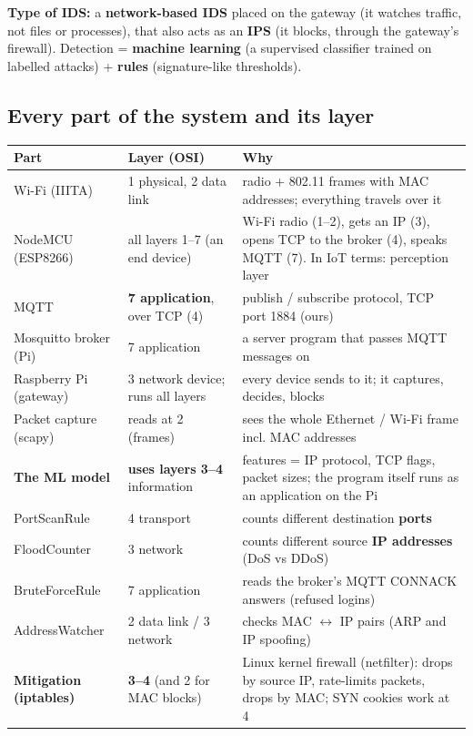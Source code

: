 \documentclass[11pt,a4paper]{article}
\begin{document}
\textbf{Type of IDS:} a \textbf{network-based IDS} placed on the gateway (it watches traffic, not files or processes),
that also acts as an \textbf{IPS} (it blocks, through the gateway's firewall). Detection = \textbf{machine learning}
(a supervised classifier trained on labelled attacks) + \textbf{rules} (signature-like thresholds).

\subsection{Every part of the system and its layer}

\begin{longtable}{P{3.5cm}P{3.6cm}P{7.9cm}}
\toprule
Part & Layer (OSI) & Why \\
\midrule
\endhead
Wi-Fi (IIITA) & 1 physical, 2 data link & radio + 802.11 frames with MAC addresses; everything travels over it \\
NodeMCU (ESP8266) & all layers 1--7 (an end device) & Wi-Fi radio (1--2), gets an IP (3), opens TCP to the broker (4),
speaks MQTT (7). In IoT terms: perception layer \\
MQTT & \textbf{7 application}, over TCP (4) & publish / subscribe protocol, TCP port 1884 (ours) \\
Mosquitto broker (Pi) & 7 application & a server program that passes MQTT messages on \\
Raspberry Pi (gateway) & 3 network device; runs all layers & every device sends to it; it captures, decides,
blocks \\
Packet capture (scapy) & reads at 2 (frames) & sees the whole Ethernet / Wi-Fi frame incl. MAC addresses \\
\textbf{The ML model} & \textbf{uses layers 3--4} information & features = IP protocol, TCP flags, packet sizes;
the program itself runs as an application on the Pi \\
PortScanRule & 4 transport & counts different destination \textbf{ports} \\
FloodCounter & 3 network & counts different source \textbf{IP addresses} (DoS vs DDoS) \\
BruteForceRule & 7 application & reads the broker's MQTT CONNACK answers (refused logins) \\
AddressWatcher & 2 data link / 3 network & checks MAC $\leftrightarrow$ IP pairs (ARP and IP spoofing) \\
\textbf{Mitigation (iptables)} & \textbf{3--4} (and 2 for MAC blocks) & Linux kernel firewall (netfilter): drops by
source IP, rate-limits packets, drops by MAC; SYN cookies work at 4 \\

\end{longtable}
\end{document}
